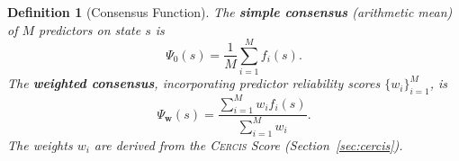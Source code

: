 \documentclass[11pt,a4paper]{article}
\newtheorem{definition}[theorem]{Definition}
\theoremstyle{definition}
\newcommand{\cercis}{\textsc{Cercis}}
\newcommand{\consensus}{\Psi}
\begin{document}
\begin{definition}[Consensus Function]
\label{def:consensus}
The \textbf{simple consensus} (arithmetic mean) of $M$ predictors on state $s$ is
\begin{equation}
    \consensus_0(s) = \frac{1}{M} \sum_{i=1}^{M} f_i(s).
\end{equation}
The \textbf{weighted consensus}, incorporating predictor reliability scores $\{w_i\}_{i=1}^M$, is
\begin{equation}
    \consensus_{\mathbf{w}}(s) = \frac{\sum_{i=1}^{M} w_i f_i(s)}{\sum_{i=1}^{M} w_i}.
\end{equation}
The weights $w_i$ are derived from the \cercis{} Score (Section~\ref{sec:cercis}).
\end{definition}
\end{document}
